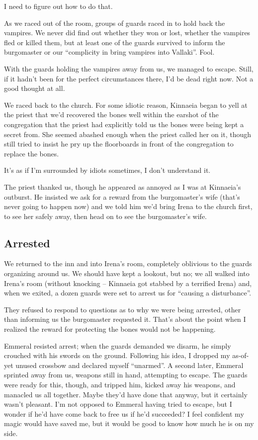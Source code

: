 I need to figure out how to do that.

As we raced out of the room, groups of guards raced in to hold back the vampires. We never did find out whether they won or lost, whether the vampires fled or killed them, but at least one of the guards survived to inform the burgomaster or our ``complicity in bring vampires into Vallaki''. Fool.

With the guards holding the vampires away from us, we managed to escape. Still, if it hadn't been for the perfect circumstances there, I'd be dead right now. Not a good thought at all.

We raced back to the church. For some idiotic reason, Kinnaeia began to yell at the priest that we'd recovered the bones well within the earshot of the congregation that the priest had explicitly told us the bones were being kept a secret from. She seemed abashed enough when the priest called her on it, though still tried to insist he pry up the floorboards in front of the congregation to replace the bones.

It's as if I'm surrounded by idiots sometimes, I don't understand it.

The priest thanked us, though he appeared as annoyed as I was at Kinnaeia's outburst. He insisted we ask for a reward from the burgomaster's wife (that's never going to happen now) and we told him we'd bring Irena to the church first, to see her safely away, then head on to see the burgomaster's wife.

\subsection*{Arrested}
We returned to the inn and into Irena's room, completely oblivious to the guards organizing around us. We should have kept a lookout, but no; we all walked into Irena's room (without knocking -- Kinnaeia got stabbed by a terrified Irena) and, when we exited, a dozen guards were set to arrest us for ``causing a disturbance''.

They refused to respond to questions as to why we were being arrested, other than informing us the burgomaster requested it. That's about the point when I realized the reward for protecting the bones would not be happening.

Emmeral resisted arrest; when the guards demanded we disarm, he simply crouched with his swords on the ground. Following his idea, I dropped my as-of-yet unused crossbow and declared myself ``unarmed''. A second later, Emmeral sprinted away from us, weapons still in hand, attempting to escape. The guards were ready for this, though, and tripped him, kicked away his weapons, and manacled us all together. Maybe they'd have done that anyway, but it certainly wasn't pleasant. I'm not opposed to Emmeral having tried to escape, but I wonder if he'd have come back to free us if he'd succeeded? I feel confident my magic would have saved me, but it would be good to know how much he is on my side.


